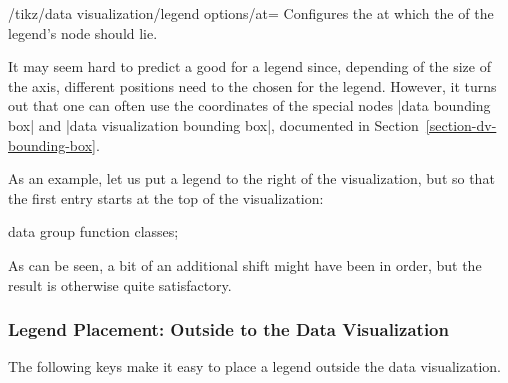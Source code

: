 \begin{key}{/tikz/data visualization/legend options/at=}
    Configures the  at which the  of the legend's
    node should lie.

    It may seem hard to predict a good  for a legend since,
    depending of the size of the axis, different positions need to the chosen
    for the legend. However, it turns out that one can often use the
    coordinates of the special nodes |data bounding box| and
    |data visualization bounding box|, documented in
    Section~\ref{section-dv-bounding-box}.

    As an example, let us put a legend to the right of the visualization, but
    so that the first entry starts at the top of the visualization:
\begin{codeexample}[
    width=8cm,
    preamble={\usetikzlibrary{datavisualization.formats.functions}},
    pre={\tikz \datavisualization data group {function classes} = {
  data [set=log, format=function] {
    var x : interval [0.2:2.5];
    func y = ln(\value x);
  }
  data [set=lin, format=function] {
    var x : interval [-2:2.5];
    func y = 0.5*\value x;
  }
  data [set=squared, format=function] {
    var x : interval [-1.5:1.5];
    func y = \value x*\value x;
  }
  data [set=exp, format=function] {
    var x : interval [-2.5:1];
    func y = exp(\value x);
  }
};},
]
\tikz \datavisualization [
  scientific axes, x axis={label=$x$},
  visualize as smooth line/.list=
    {log, lin, squared, exp},
  legend={anchor=north west, at=
    (data visualization bounding box.north east)},
  log=    {label in legend={text=$\log x$}},
  lin=    {label in legend={text=$x/2$}},
  squared={label in legend={text=$x^2$}},
  exp=    {label in legend={text=$e^x$}},
  style sheet=vary dashing]
data group {function classes};
\end{codeexample}
    As can be seen, a bit of an additional shift might have been in order, but
    the result is otherwise quite satisfactory.
\end{key}


\subsubsection{Legend Placement: Outside to the Data Visualization}
\label{section-dv-legend-outside}

The following keys make it easy to place a legend outside the data
visualization.

